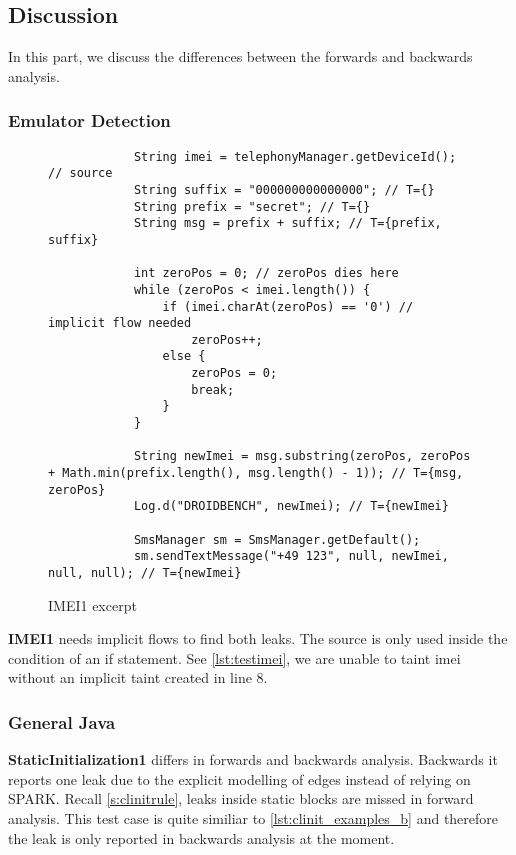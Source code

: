 \documentclass[../draft.tex]{subfiles}
\begin{document}
    \subsection{Discussion}
    In this part, we discuss the differences between the forwards and backwards analysis.

    \subsubsection{Emulator Detection}
    \begin{figure}
        \begin{lstlisting}
            String imei = telephonyManager.getDeviceId(); // source
            String suffix = "000000000000000"; // T={}
            String prefix = "secret"; // T={}
            String msg = prefix + suffix; // T={prefix, suffix}

            int zeroPos = 0; // zeroPos dies here
            while (zeroPos < imei.length()) {
                if (imei.charAt(zeroPos) == '0') // implicit flow needed
                    zeroPos++;
                else {
                    zeroPos = 0;
                    break;
                }
            }
            
            String newImei = msg.substring(zeroPos, zeroPos + Math.min(prefix.length(), msg.length() - 1)); // T={msg, zeroPos}
            Log.d("DROIDBENCH", newImei); // T={newImei}
    
            SmsManager sm = SmsManager.getDefault();
            sm.sendTextMessage("+49 123", null, newImei, null, null); // T={newImei}
        \end{lstlisting}
        \caption{IMEI1 excerpt}
        \label{lst:testimei}
    \end{figure}

    \textbf{IMEI1} needs implicit flows to find both leaks. The source is only used inside the condition of an if statement. See \autoref{lst:testimei}, we are unable to taint imei without an implicit taint created in line 8. 

    \subsubsection{General Java}
    \textbf{StaticInitialization1} differs in forwards and backwards analysis. Backwards it reports one leak due to the explicit modelling of  edges instead of relying on SPARK. Recall \autoref{s:clinitrule}, leaks inside static blocks are missed in forward analysis. This test case is quite similiar to \autoref{lst:clinit_examples_b} and therefore the leak is only reported in backwards analysis at the moment.
    
\end{document}
